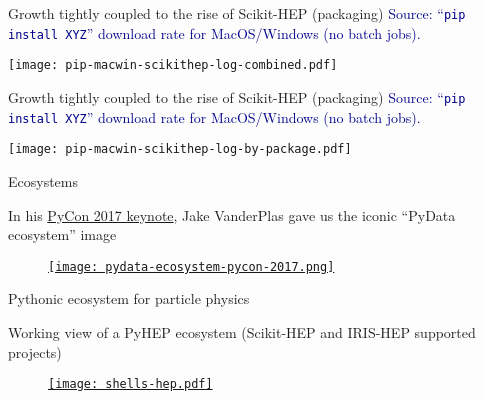 \begin{frame}{Growth tightly coupled to the rise of Scikit-HEP (packaging)}
\vspace{0.25 cm}
\textcolor{darkblue}{Source: ``\texttt{pip install XYZ}'' download rate for MacOS/Windows (no batch jobs).}

\vspace{0.1 cm}
\texttt{[image: pip-macwin-scikithep-log-combined.pdf]}
\end{frame}

\begin{frame}{Growth tightly coupled to the rise of Scikit-HEP (packaging)}
\vspace{0.25 cm}
\textcolor{darkblue}{Source: ``\texttt{pip install XYZ}'' download rate for MacOS/Windows (no batch jobs).}

\vspace{0.1 cm}
\texttt{[image: pip-macwin-scikithep-log-by-package.pdf]}
\end{frame}

\begin{frame}{Ecosystems}
\vspace{0.25 cm}
\begin{center}
    {\small In his \href{https://youtu.be/ZyjCqQEUa8o}{PyCon 2017 keynote}, Jake VanderPlas gave us the iconic ``PyData ecosystem'' image}
\end{center}

\vspace{0.1 cm}
\begin{figure}
    \begin{center}
        \href{https://coiled.io/blog/pydata-dask/}{\texttt{[image: pydata-ecosystem-pycon-2017.png]}}
    \end{center}
\end{figure}
\end{frame}

\begin{frame}{Pythonic ecosystem for particle physics}
\vspace{0.25 cm}
\begin{center}
    {\small Working view of a PyHEP ecosystem (Scikit-HEP and IRIS-HEP supported projects)}
\end{center}

\begin{figure}
    \begin{center}
        \href{https://indico.cern.ch/event/1140031/}{\texttt{[image: shells-hep.pdf]}}
    \end{center}
\end{figure}
\end{frame}
